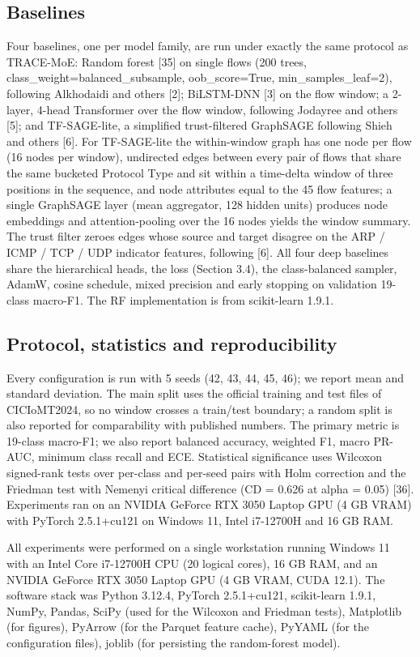 \documentclass[11pt]{article}
\begin{document}
\subsection{Baselines}
Four baselines, one per model family, are run under exactly the same protocol as TRACE-MoE: Random forest [35] on single flows (200 trees, class\_weight=balanced\_subsample, oob\_score=True, min\_samples\_leaf=2), following Alkhodaidi and others [2]; BiLSTM-DNN [3] on the flow window; a 2-layer, 4-head Transformer over the flow window, following Jodayree and others [5]; and TF-SAGE-lite, a simplified trust-filtered GraphSAGE following Shieh and others [6]. For TF-SAGE-lite the within-window graph has one node per flow (16 nodes per window), undirected edges between every pair of flows that share the same bucketed Protocol Type and sit within a time-delta window of three positions in the sequence, and node attributes equal to the 45 flow features; a single GraphSAGE layer (mean aggregator, 128 hidden units) produces node embeddings and attention-pooling over the 16 nodes yields the window summary. The trust filter zeroes edges whose source and target disagree on the ARP / ICMP / TCP / UDP indicator features, following [6]. All four deep baselines share the hierarchical heads, the loss (Section 3.4), the class-balanced sampler, AdamW, cosine schedule, mixed precision and early stopping on validation 19-class macro-F1. The RF implementation is from scikit-learn 1.9.1.

\subsection{Protocol, statistics and reproducibility}
Every configuration is run with 5 seeds (42, 43, 44, 45, 46); we report mean and standard deviation. The main split uses the official training and test files of CICIoMT2024, so no window crosses a train/test boundary; a random split is also reported for comparability with published numbers. The primary metric is 19-class macro-F1; we also report balanced accuracy, weighted F1, macro PR-AUC, minimum class recall and ECE. Statistical significance uses Wilcoxon signed-rank tests over per-class and per-seed pairs with Holm correction and the Friedman test with Nemenyi critical difference (CD = 0.626 at alpha = 0.05) [36]. Experiments ran on an NVIDIA GeForce RTX 3050 Laptop GPU (4 GB VRAM) with PyTorch 2.5.1+cu121 on Windows 11, Intel i7-12700H and 16 GB RAM.

All experiments were performed on a single workstation running Windows 11 with an Intel Core i7-12700H CPU (20 logical cores), 16 GB RAM, and an NVIDIA GeForce RTX 3050 Laptop GPU (4 GB VRAM, CUDA 12.1). The software stack was Python 3.12.4, PyTorch 2.5.1+cu121, scikit-learn 1.9.1, NumPy, Pandas, SciPy (used for the Wilcoxon and Friedman tests), Matplotlib (for figures), PyArrow (for the Parquet feature cache), PyYAML (for the configuration files), joblib (for persisting the random-forest model).
\end{document}
